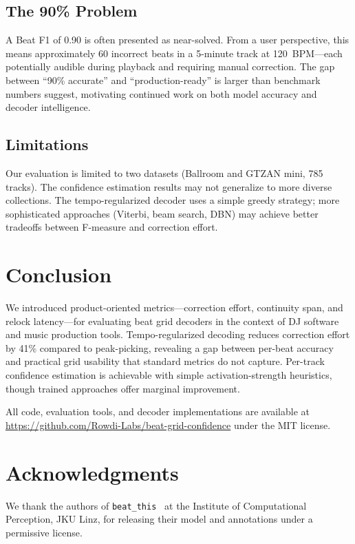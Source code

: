 \documentclass[a4paper]{article}
\begin{document}
\subsection{The 90\% Problem}

A Beat F1 of 0.90 is often presented as near-solved.
From a user perspective, this means approximately 60 incorrect beats
in a 5-minute track at 120~BPM---each potentially audible during playback
and requiring manual correction.
The gap between ``90\% accurate'' and ``production-ready'' is larger than
benchmark numbers suggest, motivating continued work on both
model accuracy and decoder intelligence.

\subsection{Limitations}

Our evaluation is limited to two datasets (Ballroom and GTZAN mini, 785 tracks).
The confidence estimation results may not generalize to more diverse collections.
The tempo-regularized decoder uses a simple greedy strategy;
more sophisticated approaches (Viterbi, beam search, DBN) may achieve
better tradeoffs between F-measure and correction effort.

\section{Conclusion}

We introduced product-oriented metrics---correction effort, continuity span,
and relock latency---for evaluating beat grid decoders in the context of
DJ software and music production tools.
Tempo-regularized decoding reduces correction effort by 41\% compared to peak-picking,
revealing a gap between per-beat accuracy and practical grid usability
that standard metrics do not capture.
Per-track confidence estimation is achievable with simple activation-strength heuristics,
though trained approaches offer marginal improvement.

All code, evaluation tools, and decoder implementations are available at
\url{https://github.com/Rowdi-Labs/beat-grid-confidence} under the MIT license.

\section{Acknowledgments}

We thank the authors of \texttt{beat\_this}~\cite{beatthis2024} at the
Institute of Computational Perception, JKU Linz, for releasing their
model and annotations under a permissive license.
\end{document}

